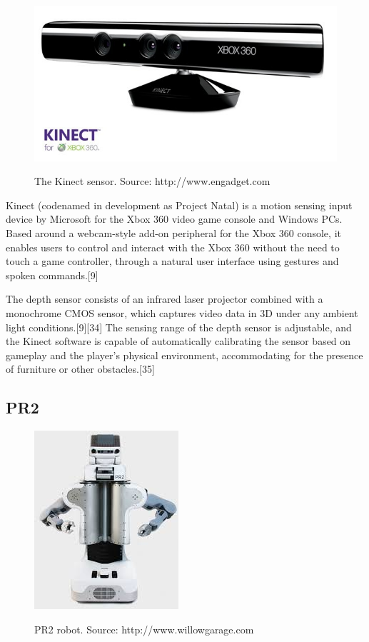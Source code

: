 \begin{figure}

{\includegraphics[width=0.5\columnwidth]{figures/kinect.jpg}}

\caption{The Kinect sensor. Source: http://www.engadget.com}
\label{fig:kinect}
\end{figure}

Kinect (codenamed in development as Project Natal) is a motion sensing input device by Microsoft for the Xbox 360 video game console and Windows PCs. Based around a webcam-style add-on peripheral for the Xbox 360 console, it enables users to control and interact with the Xbox 360 without the need to touch a game controller, through a natural user interface using gestures and spoken commands.[9]

The depth sensor consists of an infrared laser projector combined with a monochrome CMOS sensor, which captures video data in 3D under any ambient light conditions.[9][34] The sensing range of the depth sensor is adjustable, and the Kinect software is capable of automatically calibrating the sensor based on gameplay and the player's physical environment, accommodating for the presence of furniture or other obstacles.[35]
\subsection{PR2}

\begin{figure}

{\includegraphics[width=0.5\columnwidth]{figures/pr2.jpeg}}

\caption{PR2 robot. Source: http://www.willowgarage.com}
\label{fig:pr2}
\end{figure}

